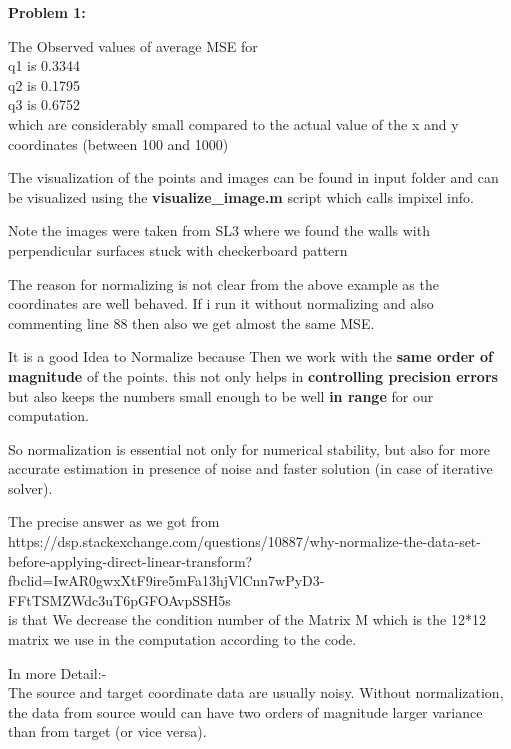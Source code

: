 \documentclass[a4paper]{article}
\begin{document}
\maketitle
\hrulefill

\textbf{\newline Problem 1:}

The Observed values of average MSE for \\
q1 is 0.3344 \\q2 is  0.1795 \\
q3 is 0.6752 \\

which are considerably small compared to the actual value of the x and y coordinates (between 100 and 1000)

The visualization of the points and images can be found in input folder and can be visualized using the \textbf{visualize\_image.m} script which calls impixel info.

Note the images were taken from SL3 where we found the walls with perpendicular surfaces stuck with checkerboard pattern


 The reason for normalizing is not clear from the above example as the coordinates are well behaved. If i run it without normalizing
and also commenting line 88 then also we get almost the same MSE.


 It is a good Idea to Normalize because Then we work with the \textbf{same order
 of magnitude} of the points. this not only helps in \textbf{controlling precision
 errors} but also keeps the numbers small enough to be well \textbf{in range} for
 our computation.

 So normalization is essential not only for numerical stability, 
 but also for more accurate estimation in presence of noise and faster 
 solution (in case of iterative solver).

 The precise answer as we got from \\
 https://dsp.stackexchange.com/questions/10887/why-normalize-the-data-set-before-applying-direct-linear-transform?fbclid=IwAR0gwxXtF9ire5mFa13hjVlCnn7wPyD3-FFtTSMZWdc3uT6pGFOAvpSSH5s
 \\
 is that We decrease the condition number of the Matrix M which is the
 12*12 matrix we use in the computation according to the code.
 
 
 \vspace{10pt}
 In more Detail:-\vspace{10pt}
 \\
 The source and target coordinate data are usually noisy. Without normalization, the data from source would can have two orders of magnitude larger variance than from target (or vice versa).
 
\end{document}
